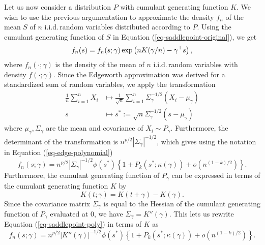 Let us now consider a distribution $P$ with cumulant generating function $K$. We wish to use the previous argumentation to approximate the density $f_n$ of the mean $S$ of $n$ i.i.d.\,random variables distributed according to $P$. Using the cumulant generating function of $S$ in Equation (\ref{eq-saddlepoint-original}), we get
\begin{equation*}
    f_n(s) = f_n(s; \gamma)\exp\left(nK(\gamma / n) - \gamma^\top s\right),
\end{equation*}
where $f_n(\cdot; \gamma)$ is the density of the mean of $n$ i.i.d.\,random variables with density $f(\cdot; \gamma)$. Since the Edgeworth approximation was derived for a standardized sum of random variables, we apply the transformation
\begin{align*}
    \frac{1}{n}\sum_{i=1}^n X_i &\mapsto \frac{1}{\sqrt{n}}\sum_{i=1}^n \Sigma_\gamma^{-1/2}(X_i - \mu_\gamma)\\
    s &\mapsto s^* := \sqrt{n}\Sigma_\gamma^{-1/2}(s - \mu_\gamma)
\end{align*}
where $\mu_\gamma, \Sigma_\gamma$ are the mean and covariance of $X_i \sim P_\gamma$. Furthermore, the determinant of the transformation is $n^{p/2}|\Sigma_\gamma|^{-1/2}$, which gives using the notation in Equation (\ref{eq-edge-polynomial})
\begin{equation} \label{eq-saddlepoint-poly}
    f_n(s; \gamma) = n^{p/2}|\Sigma_\gamma|^{-1/2} \phi(s^*)\left\{ 1 + P_k(s^*; \kappa(\gamma)) + o(n^{(1-k)/2})\right\}.
\end{equation}
Furthermore, the cumulant generating function of $P_\gamma$ can be expressed in terms of the cumulant generating function $K$ by
\begin{equation*}
    K(t; \gamma) = K(t + \gamma) - K(\gamma).
\end{equation*}
Since the covariance matrix $\Sigma_\gamma$ is equal to the Hessian of the cumulant generating function of $P_\gamma$ evaluated at 0, we have $\Sigma_\gamma = K''(\gamma)$. This lets us rewrite Equation (\ref{eq-saddlepoint-poly}) in terms of $K$ as
\begin{equation*}
    f_n(s; \gamma) = n^{p/2}|K''(\gamma)|^{-1/2} \phi(s^*)\left\{ 1 + P_k(s^*; \kappa(\gamma)) + o(n^{(1-k)/2})\right\}.
\end{equation*}

